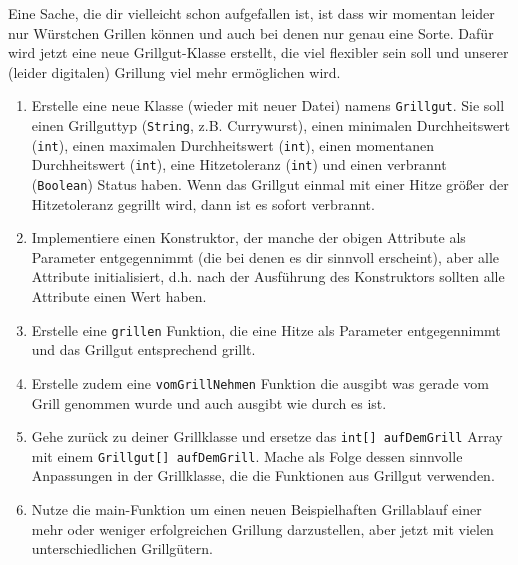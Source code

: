 \documentclass{../../sheet}
\begin{document}
\newpage
{}
Eine Sache, die dir vielleicht schon aufgefallen ist, ist dass wir momentan leider nur Würstchen Grillen können und auch bei denen nur genau eine Sorte. Dafür wird jetzt eine neue Grillgut-Klasse erstellt, die viel flexibler sein soll und unserer (leider digitalen) Grillung viel mehr ermöglichen wird.
\begin{enumerate}
    \item Erstelle eine neue Klasse (wieder mit neuer Datei) namens \texttt{Grillgut}. Sie soll einen Grillguttyp (\texttt{String}, z.B. Currywurst), einen minimalen Durchheitswert (\texttt{int}), einen maximalen Durchheitswert (\texttt{int}), einen momentanen Durchheitswert (\texttt{int}), eine Hitzetoleranz (\texttt{int}) und einen verbrannt (\texttt{Boolean}) Status haben. Wenn das Grillgut einmal mit einer Hitze größer der Hitzetoleranz gegrillt wird, dann ist es sofort verbrannt.
    \item Implementiere einen Konstruktor, der manche der obigen Attribute als Parameter entgegennimmt (die bei denen es dir sinnvoll erscheint), aber alle Attribute initialisiert, d.h. nach der Ausführung des Konstruktors sollten alle Attribute einen Wert haben.
    \item Erstelle eine \texttt{grillen} Funktion, die eine Hitze als Parameter entgegennimmt und das Grillgut entsprechend grillt. 
    \item Erstelle zudem eine \texttt{vomGrillNehmen} Funktion die ausgibt was gerade vom Grill genommen wurde und auch ausgibt wie durch es ist.
    \item Gehe zurück zu deiner Grillklasse und ersetze das \texttt{int[] aufDemGrill} Array mit einem \texttt{Grillgut[] aufDemGrill}. Mache als Folge dessen sinnvolle Anpassungen in der Grillklasse, die die Funktionen aus Grillgut verwenden.
    \item Nutze die main-Funktion um einen neuen Beispielhaften Grillablauf einer mehr oder weniger erfolgreichen
    Grillung darzustellen, aber jetzt mit vielen unterschiedlichen Grillgütern.
\end{enumerate}
\end{document}
